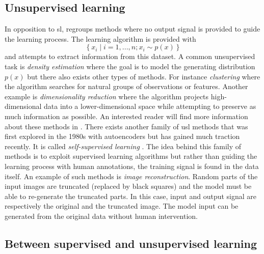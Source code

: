 \subsection{Unsupervised learning}
\label{ssec:backml:usl}

In opposition to \acrlong{sl},  regroups methods where no output signal is provided to guide the learning process. The learning algorithm is provided with 
\begin{equation}
\left\{x_i \mid i = 1,..., n ; x_i \sim p(x)\right\}
\end{equation} 
and attempts to extract information from this dataset. A common unsupervised task is \textit{density estimation} where the goal is to model the generating distribution $p(x)$ but there also exists other types of methods. For instance \textit{clustering} where the algorithm searches for natural groups of observations or features. Another example is \textit{dimensionality reduction} where the algorithm projects high-dimensional data into a lower-dimensional space while attempting to preserve as much information as possible. An interested reader will find more information about these methods in \parencite{friedman2017elements}. There exists another family of \acrlong{usl} methods that was first explored in the 1980s with autoencoders but has gained much traction recently. It is called \textit{self-supervised learning} \parencite{lecun2021self}. The idea behind this family of methods is to exploit supervised learning algorithms but rather than guiding the learning process with human annotations, the training signal is found in the data itself. An example of such methods is \textit{image reconstruction}. Random parts of the input images are truncated (\eg replaced by black squares) and the model must be able to re-generate the truncated parts. In this case, input and output signal are respectively the original and the truncated image. The model input can be generated from the original data without human intervention. 

\subsection{Between supervised and unsupervised learning}
\label{ssec:backml:inbetween}


